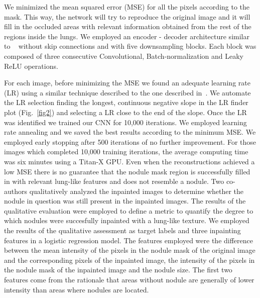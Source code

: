 \documentclass[runningheads]{llncs}
\begin{document}
 We minimized the mean squared error (MSE) for all the pixels according to the mask. This way, the network will try to reproduce the original image and it will fill in the occluded areas with relevant information obtained from the rest of the regions inside the lungs. We employed an encoder - decoder architecture similar to ~\cite{DBLP:journals/corr/abs-1711-10925} without skip connections and with five downsampling blocks. Each block was composed of three consecutive Convolutional, Batch-normalization and Leaky ReLU operations.

For each image, before minimizing the MSE we found an adequate learning rate (LR) using a similar technique described to the one described in~\cite{DBLP:journals/corr/Smith15a}. We automate the LR selection finding the longest, continuous negative slope in the LR finder plot (Fig.~\ref{fig2}) and selecting a LR close to the end of the slope.  Once the LR was identified we trained our CNN for 10,000 iterations. We employed learning rate annealing and we saved the best results according to the minimum MSE. We employed early stopping after 500 iterations of no further improvement. For those images which completed 10,000 training iterations, the average computing time was six minutes using a Titan-X GPU. Even when the reconstructions achieved a low MSE there is no guarantee that the nodule mask region is successfully filled in with relevant lung-like features and does not resemble a nodule. Two co-authors qualitatively analyzed the inpainted images to determine whether the nodule in question was still present in the inpainted images. The results of the qualitative evaluation were employed to define a metric to quantify the degree to which nodules were succesfully inpainted with a lung-like texture. We employed the results of the qualitative assessment as target labels and three inpainting features in a logistic regression model. The features employed were the difference between the mean intensity of the pixels in the nodule mask of the original image and the corresponding pixels of the inpainted image, the intensity of the pixels in the nodule mask of the inpainted image and the nodule size. The first two features come from the rationale that areas without nodule are generally of lower intensity than areas where nodules are located.
\end{document}
